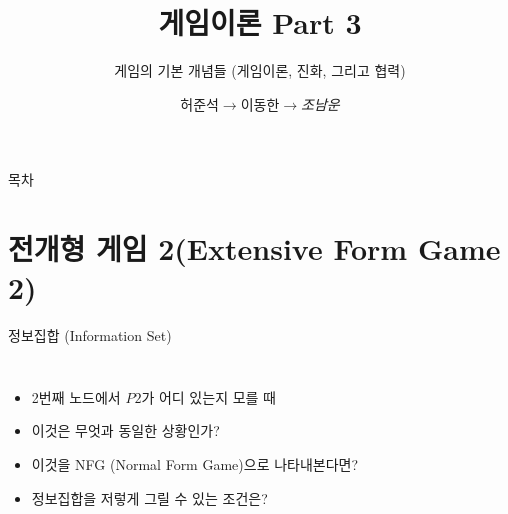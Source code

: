 \documentclass[final]{beamer}
\title{게임이론 Part 3}
\subtitle{게임의 기본 개념들 (게임이론, 진화, 그리고 협력)}
\author[조남운]{허준석$\rightarrow$이동한$\rightarrow$\emph{조남운}\\\mail}
\begin{document}
	
\begin{frame}[t]{}
	\titlepage
\end{frame}

\begin{frame}[t]{목차}
	\tableofcontents
\end{frame}

\section{전개형 게임 2(Extensive Form Game 2)} %
\label{sec:extensive_game_2}

\begin{frame}[t]{정보집합 (Information Set)}
	\begin{columns}[c]
	\column{18em}
	\begin{itemize}
		\item 2번째 노드에서 $P2$가 어디 있는지 모를 때
		\item 이것은 무엇과 동일한 상황인가? 
		\item 이것을 NFG (Normal Form Game)으로 나타내본다면?
		\item 정보집합을 저렇게 그릴 수 있는 조건은? 
	\end{itemize}
	\column{12em}
	\hspace{-1em}
	\end{columns}
\end{frame}
\end{document}

